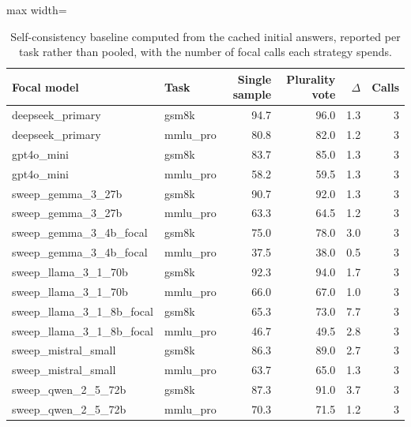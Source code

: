 \begin{table}[t]
\centering
\caption{Self-consistency baseline computed from the cached initial answers, reported per task rather than pooled, with the number of focal calls each strategy spends.\label{tab:voting}}
\begin{adjustbox}{max width=\linewidth}
\begin{tabular}{@{}llrrrr@{}}
\toprule
Focal model & Task & Single sample & Plurality vote & $\Delta$ & Calls \\
\midrule
deepseek\_primary & gsm8k & 94.7 & 96.0 & 1.3 & 3 \\
deepseek\_primary & mmlu\_pro & 80.8 & 82.0 & 1.2 & 3 \\
gpt4o\_mini & gsm8k & 83.7 & 85.0 & 1.3 & 3 \\
gpt4o\_mini & mmlu\_pro & 58.2 & 59.5 & 1.3 & 3 \\
sweep\_gemma\_3\_27b & gsm8k & 90.7 & 92.0 & 1.3 & 3 \\
sweep\_gemma\_3\_27b & mmlu\_pro & 63.3 & 64.5 & 1.2 & 3 \\
sweep\_gemma\_3\_4b\_focal & gsm8k & 75.0 & 78.0 & 3.0 & 3 \\
sweep\_gemma\_3\_4b\_focal & mmlu\_pro & 37.5 & 38.0 & 0.5 & 3 \\
sweep\_llama\_3\_1\_70b & gsm8k & 92.3 & 94.0 & 1.7 & 3 \\
sweep\_llama\_3\_1\_70b & mmlu\_pro & 66.0 & 67.0 & 1.0 & 3 \\
sweep\_llama\_3\_1\_8b\_focal & gsm8k & 65.3 & 73.0 & 7.7 & 3 \\
sweep\_llama\_3\_1\_8b\_focal & mmlu\_pro & 46.7 & 49.5 & 2.8 & 3 \\
sweep\_mistral\_small & gsm8k & 86.3 & 89.0 & 2.7 & 3 \\
sweep\_mistral\_small & mmlu\_pro & 63.7 & 65.0 & 1.3 & 3 \\
sweep\_qwen\_2\_5\_72b & gsm8k & 87.3 & 91.0 & 3.7 & 3 \\
sweep\_qwen\_2\_5\_72b & mmlu\_pro & 70.3 & 71.5 & 1.2 & 3 \\
\bottomrule
\end{tabular}
\end{adjustbox}
\end{table}
